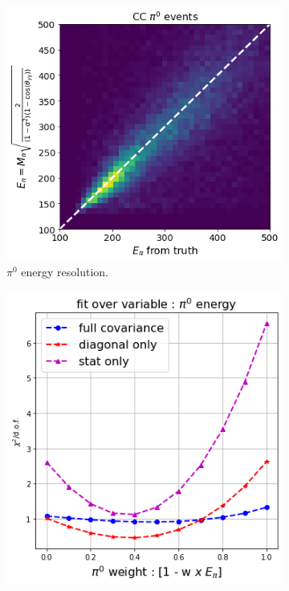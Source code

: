 \begin{figure}[H] 
\begin{center}
    \begin{subfigure}[b]{0.3\textwidth}
    \centering
    \includegraphics[width=1.00\textwidth]{pi0/pi0tune/ccpi0.png}
    \caption{\label{fig:pi0eres} $\pi^0$ energy resolution.}
    \end{subfigure}
    \begin{subfigure}[b]{0.27\textwidth}
    \centering
    \includegraphics[width=1.00\textwidth]{pi0/pi0tune/chisq_pi0energy.png}

\end{subfigure}
\end{center}
\end{figure}
